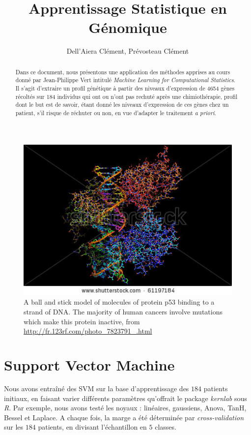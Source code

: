 \documentclass{article}
\title{Apprentissage Statistique en Génomique}
\author{Dell'Aiera Clément, Prévosteau Clément}
\date{}
\begin{document}
\maketitle

\begin{abstract}
Dans ce document, nous présentons une application des méthodes apprises au cours donné par Jean-Philippe Vert intitulé \textit{Machine Learning for Computational Statistics}. Il s'agit d'extraire un profil génétique à partir des niveaux d'expression de 4654 gènes récoltés sur 184 individus qui ont ou n'ont pas rechuté après une chimiothérapie, profil dont le but est de savoir, étant donné les niveaux d'expression de ces gènes chez un patient, s'il risque de réchuter ou non, en vue d'adapter le traitement \textit{a priori}. 
\end{abstract}

\begin{figure}[!h]\centering
\includegraphics[scale=3]{dna.png}
\caption{A ball and stick model of molecules of protein p53 binding to a strand of DNA. The majority of human cancers involve mutations which make this protein inactive, from \url{http://fr.123rf.com/photo_7823791_.html}}
\label{fig:dna}
\end{figure}

\newpage

\tableofcontents

\newpage

\section{Support Vector Machine}

Nous avons entraîné des SVM sur la base d'apprentissage des $184$ patients initiaux, en faisant varier différents paramètres qu'offrait le package \textit{kernlab} sous \textit{R}. Par exemple, nous avons testé les noyaux : linéaires, gaussiens, Anova, TanH, Bessel et Laplace. A chaque fois, la marge a été déterminée par \textit{cross-validation} sur les $184$ patients, en divisant l'échantillon en $5$ classes.\\
\end{document}
